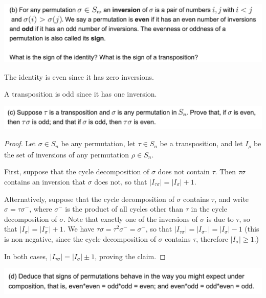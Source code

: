 \begin{mdframed}
\includegraphics[width=400pt]{img/algebra--nf--2-d8ce.png}
\end{mdframed}


The identity is even since it has zero inversions.

A transposition is odd since it has one inversion.


\begin{mdframed}
\includegraphics[width=400pt]{img/algebra--nf--2-179c.png}
\end{mdframed}

\begin{proof}
  Let $\sigma \in S_n$ be any permutation, let $\tau \in S_n$ be a transposition, and let $I_\rho$ be the set of
  inversions of any permutation $\rho \in S_n$.

  First, suppose that the cycle decomposition of $\sigma$ does not contain $\tau$. Then
  $\tau\sigma$ contains an inversion that $\sigma$ does not, so that $|I_{\tau\sigma}| = |I_\sigma| + 1$.

  Alternatively, suppose that the cycle decomposition of $\sigma$ contains $\tau$, and write
  $\sigma = \tau\sigma^-$, where $\sigma^-$ is the product of all cycles other than $\tau$ in the cycle decomposition
  of $\sigma$. Note that exactly one of the inversions of $\sigma$ is due to $\tau$, so
  that $|I_\sigma| = |I_\sigma^-| + 1$. We have $\tau\sigma = \tau^2\sigma^- = \sigma^-$, so
  that $|I_{\tau\sigma}| = |I_{\sigma^-}| = |I_\sigma| - 1$ (this is non-negative, since the cycle decomposition
  of $\sigma$ contains $\tau$, therefore $|I_\sigma| \ge 1$.)

  In both cases, $|I_{\tau\sigma}| = |I_\sigma| \pm 1$, proving the claim.
\end{proof}


\begin{mdframed}
\includegraphics[width=400pt]{img/algebra--nf--2-05a9.png}
\end{mdframed}

